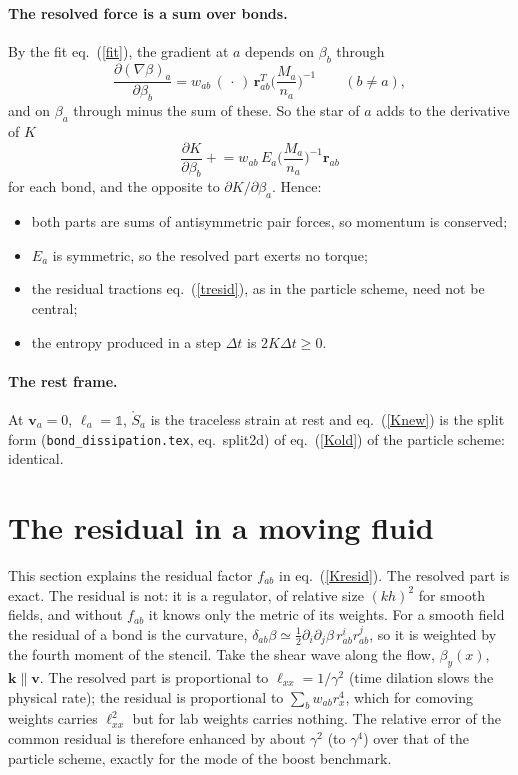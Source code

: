 \documentclass[11pt,aps,preprint,nofootinbib,superscriptaddress,tightenlines]{revtex4-2}
\newcommand{\one}{\mathds{1}}
\def\st{\begin{equation}}
\def\stp{\end{equation}}
\def\Eq#1{eq.~(\ref{#1})}
\let\oldparagraph\paragraph
\renewcommand{\paragraph}{\par\bigskip\oldparagraph}
\begin{document}
\paragraph{The resolved force is a sum over bonds.}  By the fit \Eq{fit}, the gradient at $a$ depends on $\beta_b$ through
\st
\frac{\partial(\nabla\beta)_a}{\partial\beta_b}=w_{ab}\,(\,\cdot\,)\,\bm r_{ab}^T\Big(\frac{M_a}{n_a}\Big)^{-1}\qquad(b\neq a),
\stp
and on $\beta_a$ through minus the sum of these.  So the star of $a$ adds to the derivative of $K$
\st
\frac{\partial K}{\partial\beta_b}\mathrel{+}=w_{ab}\,E_a\Big(\frac{M_a}{n_a}\Big)^{-1}\bm r_{ab}
\stp
for each bond, and the opposite to $\partial K/\partial\beta_a$.  Hence:
\begin{itemize}
\item both parts are sums of antisymmetric pair forces, so momentum is conserved;
\item $E_a$ is symmetric, so the resolved part exerts no torque;
\item the residual tractions \Eq{tresid}, as in the particle scheme, need not be central;
\item the entropy produced in a step $\Delta t$ is $2K\Delta t\ge0$.
\end{itemize}

\paragraph{The rest frame.}  At $\bm v_a=0$, $\ell_a=\one$, $\mathring S_a$ is the traceless strain at rest and \Eq{Knew} is the split form (\texttt{bond\_dissipation.tex}, eq.~split2d) of \Eq{Kold} of the particle scheme: identical.

\section{The residual in a moving fluid}
\label{sec:resid}

This section explains the residual factor $f_{ab}$ in \Eq{Kresid}.  The resolved part is exact.  The residual is not: it is a
regulator, of relative size $(kh)^2$ for smooth fields, and without $f_{ab}$ it knows only the metric of its weights.  For a smooth field the residual of a
bond is the curvature, $\delta_{ab}\beta\simeq\frac12\partial_i\partial_j\beta\,r^i_{ab}r^j_{ab}$, so it is weighted by the fourth moment of the
stencil.  Take the shear wave along the flow, $\beta_y(x)$, $\bm k\parallel\bm v$.  The resolved part is proportional to
$\ell_{xx}=1/\gamma^2$ (time dilation slows the physical rate); the residual is proportional to $\sum_bw_{ab}r_x^4$, which
for comoving weights carries $\ell_{xx}^2$ but for lab weights carries nothing.  The relative error of the
common residual is therefore enhanced by about $\gamma^2$ (to $\gamma^4$) over that of the particle scheme, exactly for
the mode of the boost benchmark.
\end{document}
